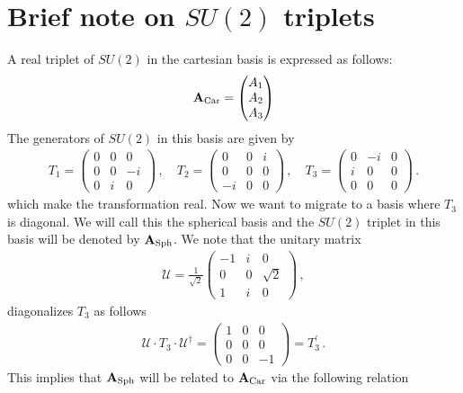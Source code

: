 \documentclass[11pt]{article}
\begin{document}
\section{Brief note on $SU(2)$ triplets}
\label{s:SU(2)GT}
A real triplet of $SU(2)$ in the cartesian basis is expressed as follows:
%
\begin{eqnarray}
\label{e:tripdefsu2}
{\bf A}_{\rm Car}=\begin{pmatrix}
A_1\\A_2\\A_3
\end{pmatrix}
\end{eqnarray}
%
The generators of $SU(2)$ in this basis are given by
%
\begin{eqnarray}
\label{e:gendef}
T_1=\begin{pmatrix}
0&0&0\\0&0&-i\\0&i&0
\end{pmatrix}\,,\quad
T_2=\begin{pmatrix}
0&0&i\\0&0&0\\-i&0&0
\end{pmatrix}\,,\quad
T_3=\begin{pmatrix}
0&-i&0\\i&0&0\\0&0&0
\end{pmatrix}\,.
\end{eqnarray}
%
which make the transformation real. Now we want to migrate to a basis where $T_3$ is diagonal.
We will call this the spherical basis and the $SU(2)$ triplet in this basis will be denoted
by ${\bf A}_{\rm Sph}$.
We note that the unitary matrix
% 
\begin{eqnarray}
\label{e:gendef1}
\mathcal{U}=\frac{1}{\sqrt{2}}\begin{pmatrix}
-1&i&0\\0&0&\sqrt{2}\\1&i&0
\end{pmatrix}\,,
\end{eqnarray}
%
diagonalizes $T_3$ as follows
% 
\begin{eqnarray}
\label{e:gendef2}
\mathcal{U}\cdot T_3 \cdot\mathcal{U}^\dagger=\begin{pmatrix}
1&0&0\\0&0&0\\0&0&-1
\end{pmatrix}=T_3^\prime\,.
\end{eqnarray}
%
This implies that ${\bf A}_{\rm Sph}$ will be related to ${\bf A}_{\rm Car}$ via the following relation
\end{document}
